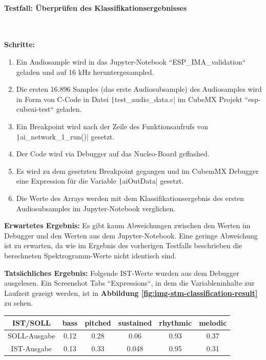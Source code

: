 \paragraph{Testfall: Überprüfen des Klassifikationsergebnisses}\mbox{}\\
\begin{adjustwidth}{0.5cm}{0cm}
\textbf{Schritte:}
\begin{enumerate}
	\item Ein Audiosample wird in das Jupyter-Notebook ``ESP\_IMA\_validation`` geladen und auf 16 kHz heruntergesampled.
	\item Die ersten 16.896 Samples (das erste Audiosubsample) des Audiosamples wird in Form von C-Code in Datei \texttt|test_audio_data.c| im CubeMX Projekt ``esp-cubeai-test`` geladen.
	\item Ein Breakpoint wird nach der Zeile des Funktionsaufrufs von \texttt|ai_network_1_run()| gesetzt.
	\item Der Code wird via Debugger auf das Nucleo-Board geflashed.
	\item Es wird zu dem gesetzten Breakpoint gegangen und im CubemMX Debugger eine Expression für die Variable \texttt|aiOutData| gesetzt.
	\item Die Werte des Arrays werden mit dem Klassifikationsergebnis des ersten Audiosubsamples im Jupyter-Notebook verglichen.
\end{enumerate}

\textbf{Erwartetes Ergebnis:} Es gibt kaum Abweichungen zwischen den Werten im Debugger und den Werten aus dem Jupyter-Notebook. Eine geringe Abweichung ist zu erwarten, da wie im Ergebnis des vorherigen Testfalls beschrieben die berechneten Spektrogramm-Werte nicht identisch sind.


\textbf{Tatsächliches Ergebnis:}
Folgende IST-Werte wurden aus dem Debugger ausgelesen. Ein Screenshot Tabs ``Expressions``, in dem die Variableninhalte zur Laufzeit gezeigt werden, ist in \textbf{Abbildung \ref{fig:img-stm-classification-result}} zu sehen.

\begin{tabular}{|c|c|c|c|c|c|}
    \hline
    IST/SOLL & bass & pitched & sustained & rhythmic & melodic \\ \hline
    SOLL-Ausgabe & 0.12 & 0.28 & 0.06 & 0.93 & 0.37 \\ \hline
    IST-Ausgabe & 0.13 & 0.33 & 0.048 & 0.95 & 0.31 \\ \hline
\end{tabular}


\end{adjustwidth}
